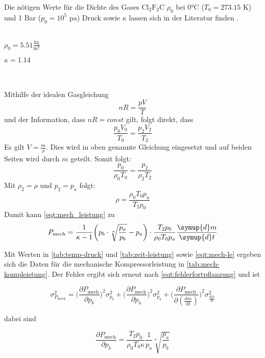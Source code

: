 Die nötigen Werte für die Dichte des Gases $\text{Cl}_\text{2}\text{F}_\text{2}\text{C}$ $\rho_0$ bei 0°C ($T_0 = 273.15$ K) und 1 Bar ($p_0 = 10^5$ pa) Druck sowie $\kappa$ lassen sich in der Literatur finden \cite{206}.
\\ \\
\centerline{$\rho_0 = 5.51 \frac{\textrm{kg}}{\textrm{m}^3}$}
\centerline{$\kappa = 1.14$}
\\ \\
Mithilfe der idealen Gasgleichung
\begin{equation}
  nR = \frac{pV}{T}
\end{equation}
und der Information, dass $nR = const$ gilt, folgt direkt, dass
\begin{equation}
  \frac{p_0 V_0}{T_0} = \frac{p_2 V_2}{T_2}
\end{equation}
Es gilt $V = \frac{m}{\rho}$. Dies wird in oben genannte Gleichung eingesetzt und auf beiden Seiten wird durch $m$ geteilt. Somit folgt:
\begin{equation}
  \frac{p_0}{\rho_0 T_0} = \frac{p_2}{\rho_2 T_2}
\end{equation}
Mit $\rho_2 = \rho$ und $p_2 = p_a$ folgt:
\begin{equation}
  \rho = \frac{\rho_0 T_0 p_a}{T_2 p_0}
\end{equation}
Damit kann \eqref{eqt:mech_leistung} zu
\begin{equation}
\label{eqt:mech-le}
  P_\text{mech} = \frac{1}{\kappa - 1} \bigg(p_b \cdot \sqrt[\kappa]{\frac{p_a}{p_b}} - p_a\bigg) \cdot \frac{T_2 p_0}{\rho_0 T_0 p_a} \frac{\symup{d}m}{\symup{d}t}
\end{equation}

Mit Werten in \autoref{tab:temp-druck} und \autoref{tab:zeit-leistung} sowie \eqref{eqt:mech-le} ergeben sich die Daten für die mechanische Kompressorleistung in \autoref{tab:mech-kompleistung}.
Der Fehler ergibt sich erneut nach \eqref{eqt:fehlerfortpflanzung} und ist

\begin{equation}
  \sigma_\text{$P_\text{mech}$}^2 = \bigg( \frac{\partial P_\text{mech}}{\partial p_b} \bigg)^2 \sigma_\text{$p_b$}^2 + \bigg( \frac{\partial P_\text{mech}}{\partial p_a} \bigg)^2 \sigma_\text{$p_a$}^2 + \bigg( \frac{\partial P_\text{mech}}{\partial (\frac{\textrm{d}m}{\textrm{d}t})} \bigg)^2 \sigma_\frac{\textrm{d}m}{\textrm{d}t}^2
\end{equation}

dabei sind

\begin{equation}
  \frac{\partial P_\text{mech}}{\partial p_b} =
    \frac{T_2 p_0}{\rho_0 T_0 \kappa} \frac{1}{p_a} \sqrt[\kappa]{\frac{p_a}{p_b}} 
\end{equation}

